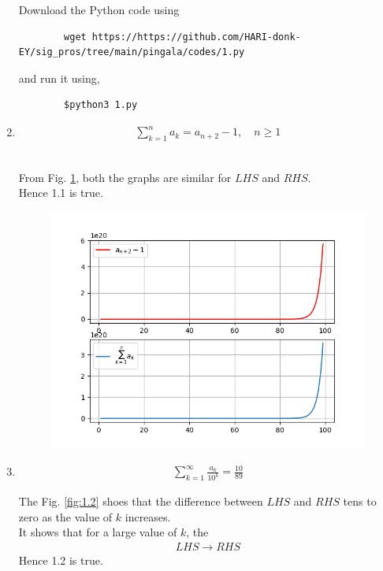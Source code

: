\documentclass[journal,12pt,twocolumn]{IEEEtran}
\renewcommand\thesection{\arabic{section}}
\begin{document}
\begin{enumerate}[label=\thesection.\arabic*,ref=\thesection.\theenumi]
	
	Download the Python code using
	
	\begin{lstlisting}
		wget https://https://github.com/HARI-donk-EY/sig_pros/tree/main/pingala/codes/1.py
	\end{lstlisting}

	and run it using,
	
	\begin{lstlisting}
		$python3 1.py
	\end{lstlisting}
	
	\item
		\begin{align}
	     		\sum_{k=1}^na_k = a_{n+2}-1, \quad n \ge 1
		\end{align}
	
	\solution\\
		From Fig. \ref{fig:1.1}, both the graphs are similar for $LHS$ and $RHS$.\\ 
		Hence 1.1 is true.

		\begin{figure}[ht]
			\begin{center}
				\includegraphics[width=0.7\columnwidth]{figs/1_1}
			\end{center}
			\label{fig:1.1}    
		\end{figure}
			
	\item 
		\begin{align}
	     		\sum_{k=1}^\infty\frac{a_k}{10^k} = \frac{10}{89}
		\end{align}

	\solution
		The Fig. \ref{fig:1.2} shoes that the difference between $LHS$ and $RHS$ tens to zero as the value of $k$ increases.\\
		It shows that for a large value of $k$, the
		\begin{align*}
			LHS \to RHS	
		\end{align*}
		Hence 1.2 is true.
	

\end{enumerate}
\end{document}
